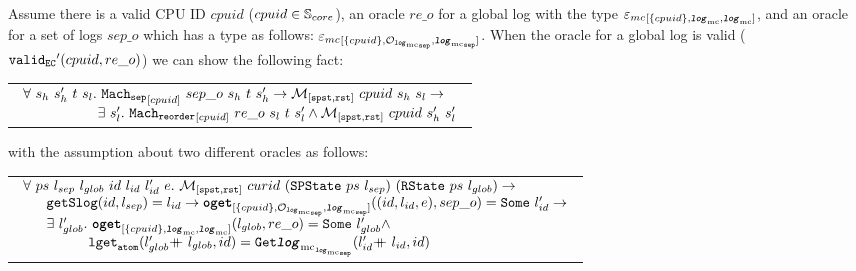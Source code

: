 \begin{lemma}
\label{lemma:chapter:conlink:separate-refines-reorder}
Assume  there is a valid CPU ID $cpuid$ ($cpuid \in {\mathbb{S}_{core}}$),
an oracle $re\_o$ for a global log with the type ${{{\varepsilon_{mc}}}_{[{\{cpuid\}}, {{{\mathrm{\texttt{\textbf{\textit{log}}}}}_{\mathrm{mc}}}}, {{{\mathrm{\texttt{\textbf{\textit{log}}}}}_{\mathrm{mc}}}}]}}$, and an oracle for a set of logs 
$sep\_o$ which has a type as follows: ${{{\varepsilon_{mc}}}_{[{\{cpuid\}}, {{\mathcal{O}_{{{{\mathrm{\texttt{\textbf{\textit{log}}}}}_{\mathrm{mc}}}_{{\mathrm{\texttt{sep}}}}}}}}, {{{{\mathrm{\texttt{\textbf{\textit{log}}}}}_{\mathrm{mc}}}_{{\mathrm{\texttt{sep}}}}}}]}}$.
When the oracle for a global log is valid (${{{{\mathrm{\texttt{valid}}}_{{\mathrm{\texttt{EC}}}}}'}({cpuid}, {re\_o })}$) we can show the following fact:
\begin{center}
\begin{tabular}{P{0.95\textwidth}}
$
\begin{array}{l}
\forall \ s_h \ s_h' \ t \ s_l . \ \singleseparatestep{cpuid}{sep\_o}{s_h}{t}{s_h'} \rightarrow  \matchspstaterstate{cpuid}{s_h}{s_l} \rightarrow \\
\ \ \ \ \ \ \ \ \ \ \ \ \ \ \ \ \exists\ s_l' . \  \singlereorderstep{cpuid}{re\_o}{s_l}{t}{s_l'} \wedge  \matchspstaterstate{cpuid}{s_h'}{s_l'}\\
\end{array}
$
\end{tabular}
\end{center}
with the assumption about two different oracles as follows:
\begin{center}
\begin{tabular}{P{0.95\textwidth}}
$
\begin{array}{l}
\forall \ ps \ l_{sep} \ l_{glob} \ id  \ l_{id} \ l_{id}' \ e .\ \matchspstaterstate{curid}{(\spstate{ps}{l_{sep}})}{(\rstate{ps}{l_{glob}})} \rightarrow \\
 \ \ \ \ \ \getseparatelog{id}{l_{sep}}{l_{id}} \rightarrow   \oget{\set{cpuid}}{\separateoraclelogtypekwd}{\separatelogtypekwd}{(id, l_{id}, e)}{sep\_o}{l_{id}'} \rightarrow \\
 \ \ \ \ \  \exists \ l_{glob}' .\ \oget{\set{cpuid}}{\mclog}{\mclog}{l_{glob}}{re\_o}{l_{glob}'} \wedge \\
 \ \ \ \ \ \ \ \ \ \  \ \ \ \ \loggetatom{\listapp{l_{glob}'}{l_{glob}}}{id}{\separatelogtwolognoeq{\listapp{l_{id}'}{l_{id}}}{id}} \\
\end{array}
$
\end{tabular}
\end{center}
\end{lemma}






